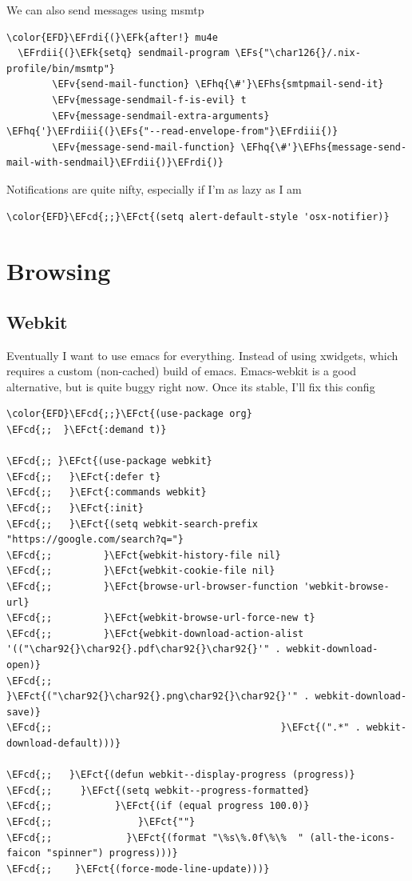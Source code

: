 \documentclass{scrartcl}
\newcommand{\EFk}[1]{\textcolor{EFk}{#1}} %
\newcommand{\EFs}[1]{\textcolor{EFs}{#1}} %
\newcommand{\EFct}[1]{\textcolor{EFct}{#1}} %
\newcommand{\EFv}[1]{\textcolor{EFv}{#1}} %
\newcommand{\EFcd}[1]{\textcolor{EFcd}{#1}} %
\newcommand{\EFhq}[1]{\textcolor{EFhq}{#1}} %
\newcommand{\EFhs}[1]{\textcolor{EFhs}{#1}} %
\newcommand{\EFrdi}[1]{\textcolor{EFrdi}{#1}} %
\newcommand{\EFrdii}[1]{\textcolor{EFrdii}{#1}} %
\newcommand{\EFrdiii}[1]{\textcolor{EFrdiii}{#1}} %
\begin{document}
We can also send messages using msmtp
\begin{Code}
\begin{Verbatim}[]
\color{EFD}\EFrdi{(}\EFk{after!} mu4e
  \EFrdii{(}\EFk{setq} sendmail-program \EFs{"\char126{}/.nix-profile/bin/msmtp"}
        \EFv{send-mail-function} \EFhq{\#'}\EFhs{smtpmail-send-it}
        \EFv{message-sendmail-f-is-evil} t
        \EFv{message-sendmail-extra-arguments} \EFhq{'}\EFrdiii{(}\EFs{"--read-envelope-from"}\EFrdiii{)}
        \EFv{message-send-mail-function} \EFhq{\#'}\EFhs{message-send-mail-with-sendmail}\EFrdii{)}\EFrdi{)}
\end{Verbatim}
\end{Code}

Notifications are quite nifty, especially if I'm as lazy as I am
\begin{Code}
\begin{Verbatim}[]
\color{EFD}\EFcd{;;}\EFct{(setq alert-default-style 'osx-notifier)}
\end{Verbatim}
\end{Code}

\section{Browsing}
\label{sec:org6c22740}
\subsection{Webkit}
\label{sec:org8cfe518}
Eventually I want to use emacs for everything. Instead of using xwidgets, which
requires a custom (non-cached) build of emacs. Emacs-webkit is a good
alternative, but is quite buggy right now. Once its stable, I'll fix this config
\begin{Code}
\begin{Verbatim}[]
\color{EFD}\EFcd{;;}\EFct{(use-package org}
\EFcd{;;  }\EFct{:demand t)}

\EFcd{;; }\EFct{(use-package webkit}
\EFcd{;;   }\EFct{:defer t}
\EFcd{;;   }\EFct{:commands webkit}
\EFcd{;;   }\EFct{:init}
\EFcd{;;   }\EFct{(setq webkit-search-prefix "https://google.com/search?q="}
\EFcd{;;         }\EFct{webkit-history-file nil}
\EFcd{;;         }\EFct{webkit-cookie-file nil}
\EFcd{;;         }\EFct{browse-url-browser-function 'webkit-browse-url}
\EFcd{;;         }\EFct{webkit-browse-url-force-new t}
\EFcd{;;         }\EFct{webkit-download-action-alist '(("\char92{}\char92{}.pdf\char92{}\char92{}'" . webkit-download-open)}
\EFcd{;;                                        }\EFct{("\char92{}\char92{}.png\char92{}\char92{}'" . webkit-download-save)}
\EFcd{;;                                        }\EFct{(".*" . webkit-download-default)))}

\EFcd{;;   }\EFct{(defun webkit--display-progress (progress)}
\EFcd{;;     }\EFct{(setq webkit--progress-formatted}
\EFcd{;;           }\EFct{(if (equal progress 100.0)}
\EFcd{;;               }\EFct{""}
\EFcd{;;             }\EFct{(format "\%s\%.0f\%\%  " (all-the-icons-faicon "spinner") progress)))}
\EFcd{;;    }\EFct{(force-mode-line-update)))}
\end{Verbatim}
\end{Code}
\end{document}
